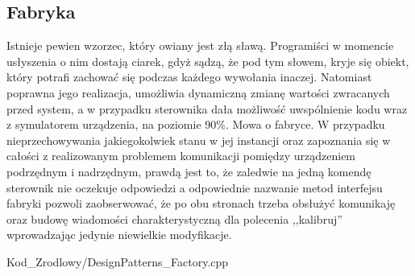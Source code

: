     \subsection{Fabryka}
        Istnieje pewien wzorzec, który owiany jest złą sławą. Programiści w momencie usłyszenia o nim dostają ciarek, gdyż sądzą, że pod tym słowem,
        kryje się obiekt, który potrafi zachować się podczas każdego wywołania inaczej. Natomiast poprawna jego realizacja, umożliwia 
        dynamiczną zmianę wartości zwracanych przed system, a w przypadku sterownika dała możliwość uwspólnienie kodu wraz z symulatorem urządzenia,
        na poziomie 90\%. Mowa o fabryce. W przypadku nieprzechowywania jakiegokolwiek stanu w jej instancji oraz zapoznania się w całości z realizowanym problemem
        komunikacji pomiędzy urządzeniem podrzędnym i nadrzędnym, prawdą jest to, że zaledwie na jedną komendę sterownik nie oczekuje odpowiedzi a odpowiednie
        nazwanie metod interfejsu fabryki pozwoli zaobserwować, że po obu stronach trzeba obsłużyć komunikaję oraz budowę wiadomości charakterystyczną
        dla polecenia ,,kalibruj'' wprowadzając jedynie niewielkie modyfikacje. 
        
        {Kod_Zrodlowy/DesignPatterns_Factory.cpp}
